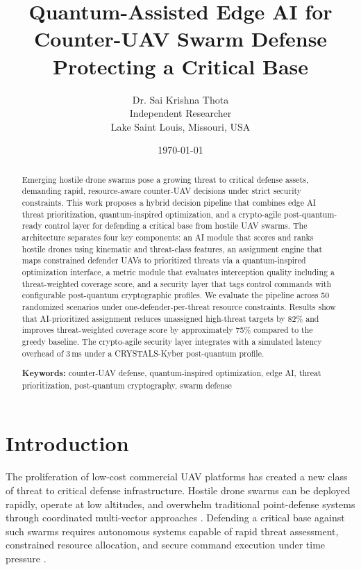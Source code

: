 \documentclass[12pt, a4paper]{article}
\title{\textbf{Quantum-Assisted Edge AI for Counter-UAV Swarm Defense Protecting a Critical Base}}
\author{
  Dr. Sai Krishna Thota\\
  \small Independent Researcher\\
  \small Lake Saint Louis, Missouri, USA
}
\date{\today}
\begin{document}
\maketitle

\begin{abstract}
Emerging hostile drone swarms pose a growing threat to critical defense assets, demanding rapid, resource-aware counter-UAV decisions under strict security constraints. This work proposes a hybrid decision pipeline that combines edge AI threat prioritization, quantum-inspired optimization, and a crypto-agile post-quantum-ready control layer for defending a critical base from hostile UAV swarms. The architecture separates four key components: an AI module that scores and ranks hostile drones using kinematic and threat-class features, an assignment engine that maps constrained defender UAVs to prioritized threats via a quantum-inspired optimization interface, a metric module that evaluates interception quality including a threat-weighted coverage score, and a security layer that tags control commands with configurable post-quantum cryptographic profiles. We evaluate the pipeline across 50 randomized scenarios under one-defender-per-threat resource constraints. Results show that AI-prioritized assignment reduces unassigned high-threat targets by 82\% and improves threat-weighted coverage score by approximately 75\% compared to the greedy baseline. The crypto-agile security layer integrates with a simulated latency overhead of 3\,ms under a CRYSTALS-Kyber post-quantum profile.

\medskip
\noindent\textbf{Keywords:} counter-UAV defense, quantum-inspired optimization, edge AI, threat prioritization, post-quantum cryptography, swarm defense
\end{abstract}

\section{Introduction}

The proliferation of low-cost commercial UAV platforms has created a new class of threat to critical defense infrastructure. Hostile drone swarms can be deployed rapidly, operate at low altitudes, and overwhelm traditional point-defense systems through coordinated multi-vector approaches \cite{guvenc2018detection}. Defending a critical base against such swarms requires autonomous systems capable of rapid threat assessment, constrained resource allocation, and secure command execution under time pressure \cite{shi2018drone}.
\end{document}
